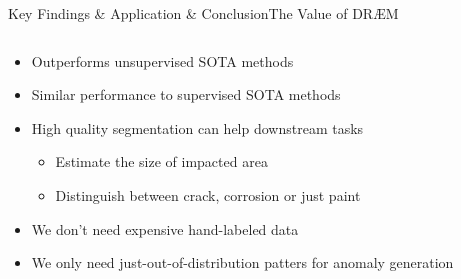 \begin{frame}{Key Findings \& Application \& Conclusion}{The Value of DRÆM}
    \begin{columns}
        \begin{column}{0.5\textwidth}
            \begin{itemize}[<+->]
                \item Outperforms unsupervised SOTA methods
                \item Similar performance to supervised SOTA methods
                \item High quality segmentation can help downstream tasks
                \begin{itemize}
                    \item Estimate the size of impacted area
                    \item Distinguish between crack, corrosion or just paint
                \end{itemize}
                \item We don't need expensive hand-labeled data
                \item We only need just-out-of-distribution patters for anomaly generation
            \end{itemize}
        \end{column}
        \begin{column}{0.5\textwidth}
        \end{column}
    \end{columns}
\end{frame}

